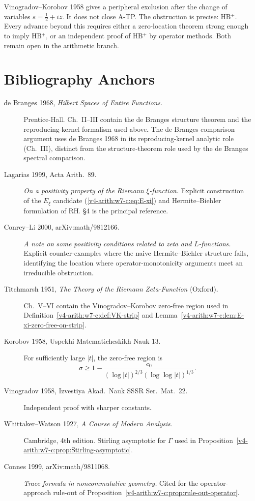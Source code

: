 \begin{remark}
\label{v4-arith:w7-c:rem:beilinson-closing}
Vinogradov--Korobov 1958 gives a peripheral exclusion after the
change of variables \(s=\tfrac12+iz\). It does not close A-TP.
The obstruction is precise: HB\(^{+}\). Every advance beyond this
requires either a zero-location theorem strong enough to imply
HB\(^{+}\), or an independent proof of HB\(^{+}\) by operator methods.
Both remain open in the arithmetic branch.
\end{remark}

\section{Bibliography Anchors}
\label{v4-arith:w7-c:bibliography}

\begin{description}
\item[de Branges 1968, \emph{Hilbert Spaces of Entire Functions}.]
Prentice-Hall. Ch.~II--III contain the de Branges structure theorem
and the reproducing-kernel formalism used above.
The de Branges comparison argument uses de Branges 1968 in its reproducing-kernel
analytic role (Ch.~III), distinct from the structure-theorem role
used by the de Branges spectral comparison.
\item[Lagarias 1999, Acta Arith.~89.] \emph{On a positivity property
of the Riemann \(\xi\)-function.} Explicit
construction of the \(E_{\xi}\) candidate
(\eqref{v4-arith:w7-c:eq:E-xi}) and Hermite--Biehler formulation
of RH. \S4 is the principal reference.
\item[Conrey--Li 2000, arXiv:math/9812166.] \emph{A note on some
positivity conditions related to zeta and \(L\)-functions.} Explicit
counter-examples where the naive Hermite--Biehler structure fails,
identifying the location where operator-monotonicity arguments
meet an irreducible obstruction.
\item[Titchmarsh 1951, \emph{The Theory of the Riemann
Zeta-Function} (Oxford).] Ch.~V--VI contain the
Vinogradov--Korobov zero-free region used in
Definition~\ref{v4-arith:w7-c:def:VK-strip} and
Lemma~\ref{v4-arith:w7-c:lem:E-xi-zero-free-on-strip}.
\item[Korobov 1958, Uspekhi Matematicheskikh Nauk 13.]
For sufficiently large \(|t|\), the zero-free region is
\[
\sigma\geq1-\frac{c_0}{(\log|t|)^{2/3}(\log\log|t|)^{1/3}}.
\]
\item[Vinogradov 1958, Izvestiya Akad.~Nauk SSSR Ser.~Mat.~22.]
Independent proof with sharper constants.
\item[Whittaker--Watson 1927, \emph{A Course of Modern Analysis}.]
Cambridge, 4th edition. Stirling asymptotic for \(\Gamma\) used in
Proposition~\ref{v4-arith:w7-c:prop:Stirling-asymptotic}.
\item[Connes 1999, arXiv:math/9811068.] \emph{Trace formula in
noncommutative geometry.} Cited for the operator-approach rule-out
of Proposition~\ref{v4-arith:w7-c:prop:rule-out-operator}.
\end{description}

